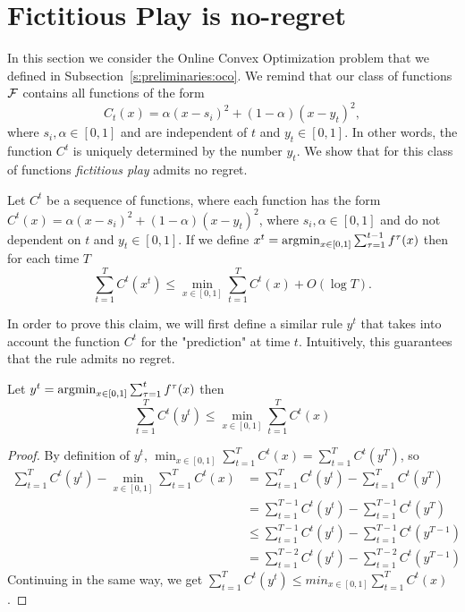 \section{Fictitious Play is no-regret}\label{s:fictitious_noregret}

In this section we consider the Online Convex Optimization problem
that we defined in Subsection~\ref{s:preliminaries:oco}. We remind that
our class of functions $\mathcal{F}$ contains all functions of the form
\[
  C_t(x) = \alpha(x-s_i)^2 + (1-\alpha)(x-y_t)^2,
\]
where $s_i,\alpha \in [0,1]$ and are independent of $t$ and $y_t \in [0,1]$.
In other words, the function $C^t$ is uniquely determined by the number $y_t$.
We show that for this class of functions \emph{fictitious play} admits no regret.
\begin{theorem}\label{t:no_regret}
  Let $C^t$ be a sequence of functions, where each function has the form
  $C^t(x) = \alpha(x-s_i)^2 + (1-\alpha)(x-y_t)^2$,
  where $s_i,\alpha \in [0,1]$ and do not dependent on $t$
  and $y_t \in [0,1]$.
  If we define \(x^t = \operatorname*{argmin}_{x \in [0,1]} \sum_{\tau = 1}^{t-1} f^\tau (x) \)
  then for each time $T$
  \[
    \sum_{t = 1}^{T} C^t(x^t) \leq
    \min_{x \in [0,1]} \sum_{t=1}^T C^t(x) + O(\log  T).
  \]
\end{theorem}

In order to prove this claim, we will first define a similar rule $y^t$
that takes into account the function $C^t$ for the "prediction" at time $t$.
Intuitively, this guarantees that the rule admits no regret.

\begin{lemma}
  Let
  \(y^t = \operatorname*{argmin}_{x \in [0,1]} \sum_{\tau = 1}^t f^\tau (x)\)
  then
  \[
    \sum_{t=1}^T C^t(y^t) \leq \min_{x \in [0,1]} \sum_{t=1}^T C^t(x)
  \]
\end{lemma}

\begin{proof}By definition of $y^t$,
  $\min_{x \in [0,1]} \sum_{t=1}^T C^t(x) = \sum_{t=1}^T C^t(y^T)$, so
  \begin{align*}
    \sum_{t=1}^T C^t(y^t) - \min_{x \in [0,1]} \sum_{t=1}^T C^t(x) &=
    \sum_{t=1}^T C^t(y^t) - \sum_{t=1}^T C^t(y^T)\\
    &= \sum_{t=1}^{T-1} C^t(y^t) - \sum_{t=1}^{T-1} C^t(y^T)\\
    &\leq \sum_{t=1}^{T-1} C^t(y^t) - \sum_{t=1}^{T-1} C^t(y^{T-1})\\
    &= \sum_{t=1}^{T-2} C^t(y^t) - \sum_{t=1}^{T-2} C^t(y^{T-1})
  \end{align*}
  Continuing in the same way, we get
  $\sum_{t=1}^T C^t(y^t) \leq min_{x \in [0,1]} \sum_{t=1}^T C^t(x)$.
\end{proof}

